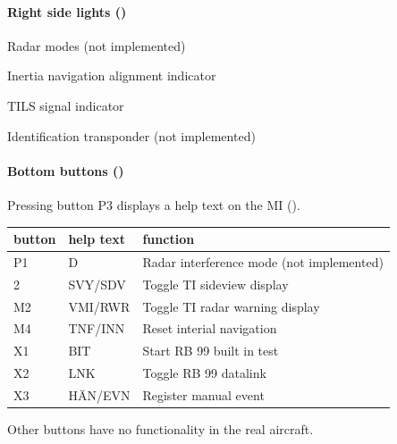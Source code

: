 \paragraph{Right side lights ()}
\begin{description}[nosep]
  \item[ID/J] Radar modes (not implemented)
  \item[TNF] Inertia navigation alignment indicator
  \item[TLS] TILS signal indicator
  \item[IK] Identification transponder (not implemented)
\end{description}

\paragraph{Bottom buttons ()}
Pressing button P3 displays a help text on the MI ().

\begin{tabular}{lll}
  button & help text & function \\
  \hline
  P1 & D       & Radar interference mode (not implemented) \\
  2  & SVY/SDV & Toggle TI sideview display \\
  M2 & VMI/RWR & Toggle TI radar warning display \\
  M4 & TNF/INN & Reset interial navigation \\
  X1 & BIT     & Start RB 99 built in test \\
  X2 & LNK     & Toggle RB 99 datalink \\
  X3 & HÄN/EVN & Register manual event
\end{tabular}

Other buttons have no functionality in the real aircraft.

